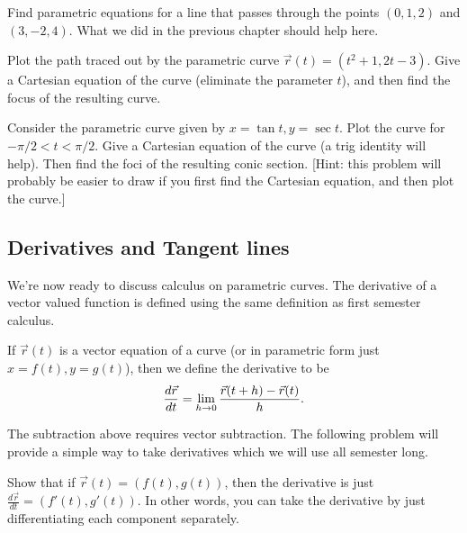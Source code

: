 \begin{problem}\label{line equation to refer to}
Find parametric equations for a line that passes through the points $(0,1,2)$ and $(3,-2,4)$. What we did in the previous chapter should help here.  
\end{problem}

\begin{problem}
Plot the path traced out by the parametric curve $\vec r(t)= (t^2+1, 2t-3).$ Give a Cartesian equation of the curve (eliminate the parameter $t$), and then find the focus of the resulting curve.
\end{problem}

\begin{problem}
Consider the parametric curve given by $x=\tan t, y=\sec t$. Plot the curve for $-\pi/2<t<\pi/2$. Give a Cartesian equation of the curve (a trig identity will help).  Then find the foci of the resulting conic section. [Hint: this problem will probably be easier to draw if you first find the Cartesian equation, and then plot the curve.]
\end{problem}

\subsection{Derivatives and Tangent lines}\label{derivatives and tangent lines}
We're now ready to discuss calculus on parametric curves. The derivative of a vector valued function is defined using the same definition as first semester calculus.

\begin{definition}
If $\vec r(t)$ is a vector equation of a curve (or in parametric form just $x=f(t), y=g(t)$), then we define the derivative to be $$\frac{d\vec r}{dt}=\displaystyle\lim_{h\to 0}\frac{\vec r(t+h)-\vec r(t)}{h}.$$
\end{definition}
The subtraction above requires vector subtraction.  The following problem will provide a simple way to take derivatives which we will use all semester long.

\begin{problem} 
Show that if $\vec r(t) = (f(t),g(t))$, then the derivative is just $\frac{d\vec r}{dt} = (f'(t),g'(t))$.  In other words, you can take the derivative by just differentiating each component separately.  
\end{problem}


